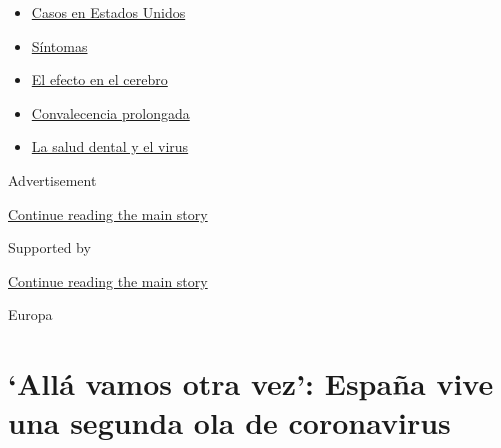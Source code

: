 \begin{itemize}
\tightlist
\item
  \href{https://www.nytimes3xbfgragh.onion/es/interactive/2020/espanol/mundo/coronavirus-en-estados-unidos.html?name=styln-coronavirus-es\&region=TOP_BANNER\&block=storyline_menu_recirc\&action=click\&pgtype=Article\&impression_id=17019081-f4c3-11ea-8e04-4768752866ed\&variant=undefined}{Casos
  en Estados Unidos}
\item
  \href{https://www.nytimes3xbfgragh.onion/es/interactive/2020/08/06/espanol/ciencia-y-tecnologia/tengo-covid-19-sintomas.html?name=styln-coronavirus-es\&region=TOP_BANNER\&block=storyline_menu_recirc\&action=click\&pgtype=Article\&impression_id=17019082-f4c3-11ea-8e04-4768752866ed\&variant=undefined}{Síntomas}
\item
  \href{https://www.nytimes3xbfgragh.onion/es/2020/09/11/espanol/ciencia-y-tecnologia/cerebro-coronavirus.html?name=styln-coronavirus-es\&region=TOP_BANNER\&block=storyline_menu_recirc\&action=click\&pgtype=Article\&impression_id=17019083-f4c3-11ea-8e04-4768752866ed\&variant=undefined}{El
  efecto en el cerebro}
\item
  \href{https://www.nytimes3xbfgragh.onion/es/2020/09/09/espanol/ciencia-y-tecnologia/salud-mental-coronavirus.html?name=styln-coronavirus-es\&region=TOP_BANNER\&block=storyline_menu_recirc\&action=click\&pgtype=Article\&impression_id=17019084-f4c3-11ea-8e04-4768752866ed\&variant=undefined}{Convalecencia
  prolongada}
\item
  \href{https://www.nytimes3xbfgragh.onion/es/2020/09/08/espanol/ciencia-y-tecnologia/dentistas-covid-dientes.html?name=styln-coronavirus-es\&region=TOP_BANNER\&block=storyline_menu_recirc\&action=click\&pgtype=Article\&impression_id=17019085-f4c3-11ea-8e04-4768752866ed\&variant=undefined}{La
  salud dental y el virus}
\end{itemize}

Advertisement

\protect\hyperlink{after-top}{Continue reading the main story}

Supported by

\protect\hyperlink{after-sponsor}{Continue reading the main story}

Europa

\hypertarget{alluxe1-vamos-otra-vez-espauxf1a-vive-una-segunda-ola-de-coronavirus}{%
\section{`Allá vamos otra vez': España vive una segunda ola de
coronavirus}\label{alluxe1-vamos-otra-vez-espauxf1a-vive-una-segunda-ola-de-coronavirus}}

